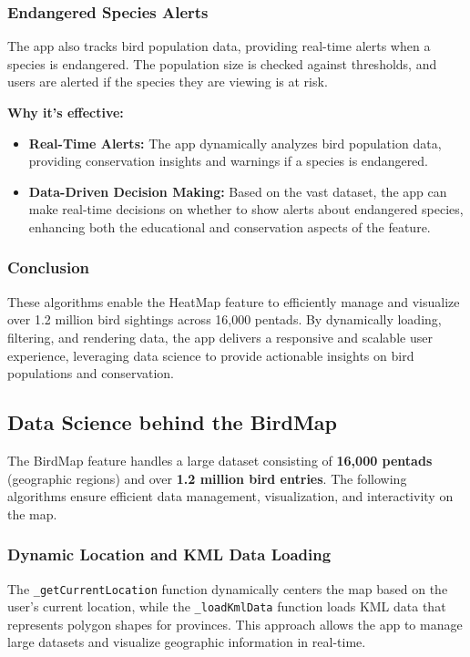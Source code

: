 \documentclass{article}
\begin{document}
\subsubsection{Endangered Species Alerts}
The app also tracks bird population data, providing real-time alerts when a species is endangered. The population size is checked against thresholds, and users are alerted if the species they are viewing is at risk.

\textbf{Why it's effective:}
\begin{itemize}
    \item \textbf{Real-Time Alerts:} The app dynamically analyzes bird population data, providing conservation insights and warnings if a species is endangered.
    \item \textbf{Data-Driven Decision Making:} Based on the vast dataset, the app can make real-time decisions on whether to show alerts about endangered species, enhancing both the educational and conservation aspects of the feature.
\end{itemize}

\subsubsection{Conclusion}
These algorithms enable the HeatMap feature to efficiently manage and visualize over 1.2 million bird sightings across 16,000 pentads. By dynamically loading, filtering, and rendering data, the app delivers a responsive and scalable user experience, leveraging data science to provide actionable insights on bird populations and conservation.

\subsection{Data Science behind the BirdMap}

The BirdMap feature handles a large dataset consisting of \textbf{16,000 pentads} (geographic regions) and over \textbf{1.2 million bird entries}. The following algorithms ensure efficient data management, visualization, and interactivity on the map.

\subsubsection{Dynamic Location and KML Data Loading}
The \texttt{\_getCurrentLocation} function dynamically centers the map based on the user's current location, while the \texttt{\_loadKmlData} function loads KML data that represents polygon shapes for provinces. This approach allows the app to manage large datasets and visualize geographic information in real-time.
\end{document}

